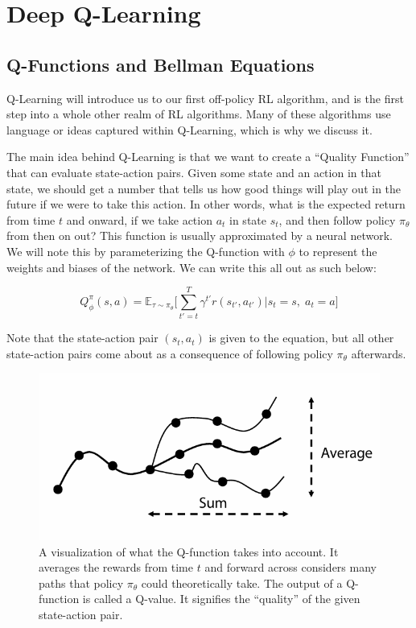 \section{Deep Q-Learning}
\subsection{Q-Functions and Bellman Equations}
    \large Q-Learning will introduce us to our first off-policy RL algorithm, and is the first step into a whole other realm of RL algorithms. Many of these algorithms use language or ideas captured within Q-Learning, which is why we discuss it. 

    The main idea behind Q-Learning is that we want to create a ``Quality Function'' that can evaluate state-action pairs. Given some state and an action in that state, we should get a number that tells us how good things will play out in the future if we were to take this action. In other words, what is the expected return from time $t$ and onward, if we take action $a_t$ in state $s_t$, and then follow policy $\pi_\theta$ from then on out? This function is usually approximated by a neural network. We will note this by parameterizing the Q-function with $\phi$ to represent the weights and biases of the network. We can write this all out as such below:

    $$Q_\phi^\pi(s, a) = \mathbb{E}_{\tau \sim \pi_\theta} \biggl[\sum_{t' = t}^T \gamma^{t'}r(s_{t'}, a_{t'}) | s_t = s,\;a_t = a\biggr]$$
    
    Note that the state-action pair $(s_t, a_t)$ is given to the equation, but all other state-action pairs come about as a consequence of following policy $\pi_\theta$ afterwards. 

    \begin{figure}[H]
        \centering
        \includegraphics[width=0.7\linewidth]{rl/qlearning.png}
        \caption{A visualization of what the Q-function takes into account. It averages the rewards from time $t$ and forward across considers many paths that policy $\pi_\theta$ could theoretically take. The output of a Q-function is called a Q-value. It signifies the ``quality'' of the given state-action pair.}
        \label{fig:qlearning}
    \end{figure}

